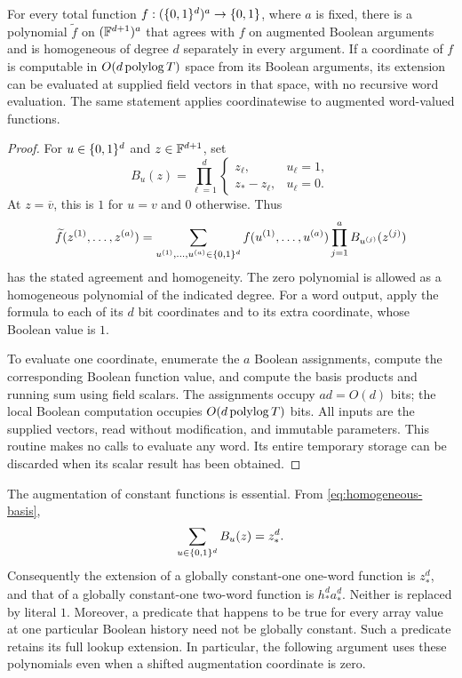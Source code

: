\begin{lemma}\label{lem:homogenization}
For every total function $f:(\{0,1\}^d)^a\to\{0,1\}$, where $a$ is fixed,
there is a polynomial $\widetilde f$ on $(\mathbb F^{d+1})^a$ that agrees with $f$
on augmented Boolean arguments and is homogeneous of degree $d$ separately
in every argument.  If a coordinate of $f$ is computable in
$O(d\operatorname{polylog} T)$ space from its Boolean arguments, its extension can be
evaluated at supplied field vectors in that space, with no recursive word
evaluation.  The same statement applies coordinatewise to augmented
word-valued functions.
\end{lemma}
\begin{proof}
For $u\in\{0,1\}^d$ and $z\in\mathbb F^{d+1}$, set
\begin{equation}\label{eq:homogeneous-basis}
 B_u(z)=\prod_{\ell=1}^d
 \begin{cases}
  z_\ell,&u_\ell=1,\\
  z_*-z_\ell,&u_\ell=0.
 \end{cases}
\end{equation}
At $z=\overline v$, this is $1$ for $u=v$ and $0$ otherwise.  Thus
\begin{equation}\label{eq:lookup-extension}
 \widetilde f(z^{(1)},\ldots,z^{(a)})
 =\sum_{u^{(1)},\ldots,u^{(a)}\in\{0,1\}^d}
 f(u^{(1)},\ldots,u^{(a)})
 \prod_{j=1}^a B_{u^{(j)}}(z^{(j)})
\end{equation}
has the stated agreement and homogeneity.  The zero polynomial is allowed
as a homogeneous polynomial of the indicated degree.  For a word output,
apply the formula to each of its $d$ bit coordinates and to its extra
coordinate, whose Boolean value is $1$.

To evaluate one coordinate, enumerate the $a$ Boolean assignments, compute
the corresponding Boolean function value, and compute the basis products
and running sum using field scalars.  The assignments occupy $ad=O(d)$ bits;
the local Boolean computation occupies $O(d\operatorname{polylog} T)$ bits.  All inputs
are the supplied vectors, read without modification, and immutable
parameters.  This routine makes no
calls to evaluate any word.  Its entire temporary storage can be discarded
when its scalar result has been obtained.
\end{proof}

The augmentation of constant functions is essential.  From
\eqref{eq:homogeneous-basis},
\[
 \sum_{u\in\{0,1\}^d}B_u(z)=z_*^d.
\]
Consequently the extension of a globally constant-one one-word function is
$z_*^d$, and that of a globally constant-one two-word function is
$h_*^d a_*^d$.  Neither is replaced by literal $1$.  Moreover, a predicate
that happens to be true for every array value at one particular Boolean
history need not be globally constant.  Such a predicate retains its full
lookup extension.  In particular, the following argument uses these
polynomials even when a shifted augmentation coordinate is zero.

